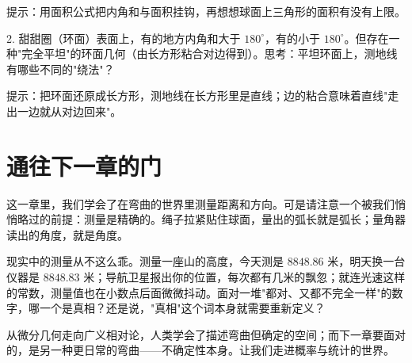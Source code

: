 提示：用面积公式把内角和与面积挂钩，再想想球面上三角形的面积有没有上限。

2. 甜甜圈（环面）表面上，有的地方内角和大于 $180^\circ$，有的小于 $180^\circ$。但存在一种"完全平坦"的环面几何（由长方形粘合对边得到）。思考：平坦环面上，测地线有哪些不同的"绕法"？

提示：把环面还原成长方形，测地线在长方形里是直线；边的粘合意味着直线"走出一边就从对边回来"。

\section*{通往下一章的门}

这一章里，我们学会了在弯曲的世界里测量距离和方向。可是请注意一个被我们悄悄略过的前提：测量是精确的。绳子拉紧贴住球面，量出的弧长就是弧长；量角器读出的角度，就是角度。

现实中的测量从不这么乖。测量一座山的高度，今天测是 $8848.86$ 米，明天换一台仪器是 $8848.83$ 米；导航卫星报出你的位置，每次都有几米的飘忽；就连光速这样的常数，测量值也在小数点后面微微抖动。面对一堆"都对、又都不完全一样"的数字，哪一个是真相？还是说，"真相"这个词本身就需要重新定义？

从微分几何走向广义相对论，人类学会了描述弯曲但确定的空间；而下一章要面对的，是另一种更日常的弯曲——不确定性本身。让我们走进概率与统计的世界。
